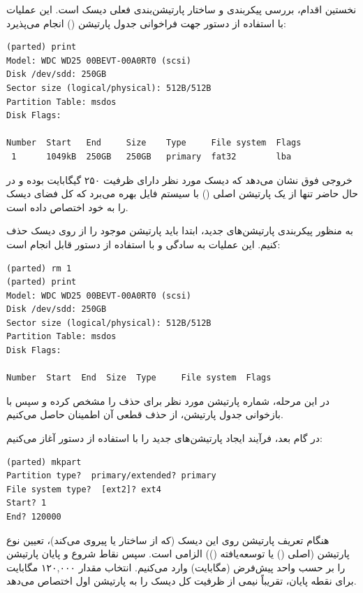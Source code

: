 نخستین اقدام، بررسی پیکربندی و ساختار پارتیشن‌بندی فعلی دیسک است. این عملیات با استفاده از دستور  جهت فراخوانی جدول پارتیشن () انجام می‌پذیرد:

\begin{latin}
\begin{lstlisting}
(parted) print
Model: WDC WD25 00BEVT-00A0RT0 (scsi)
Disk /dev/sdd: 250GB
Sector size (logical/physical): 512B/512B
Partition Table: msdos
Disk Flags:

Number  Start   End     Size    Type     File system  Flags
 1      1049kB  250GB   250GB   primary  fat32        lba
\end{lstlisting}
\end{latin}

خروجی فوق نشان می‌دهد که دیسک مورد نظر دارای ظرفیت ۲۵۰ گیگابایت بوده و در حال حاضر تنها از یک پارتیشن اصلی () با سیستم فایل  بهره می‌برد که کل فضای دیسک را به خود اختصاص داده است.

به منظور پیکربندی پارتیشن‌های جدید، ابتدا باید پارتیشن موجود را از روی دیسک حذف کنیم. این عملیات به سادگی و با استفاده از دستور  قابل انجام است:

\begin{latin}
\begin{lstlisting}
(parted) rm 1
(parted) print
Model: WDC WD25 00BEVT-00A0RT0 (scsi)
Disk /dev/sdd: 250GB
Sector size (logical/physical): 512B/512B
Partition Table: msdos
Disk Flags:

Number  Start  End  Size  Type     File system  Flags
\end{lstlisting}
\end{latin}

در این مرحله، شماره پارتیشن مورد نظر برای حذف را مشخص کرده و سپس با بازخوانی جدول پارتیشن، از حذف قطعی آن اطمینان حاصل می‌کنیم.

در گام بعد، فرآیند ایجاد پارتیشن‌های جدید را با استفاده از دستور  آغاز می‌کنیم:

\begin{latin}
\begin{lstlisting}
(parted) mkpart
Partition type?  primary/extended? primary
File system type?  [ext2]? ext4
Start? 1
End? 120000
\end{lstlisting}
\end{latin}

هنگام تعریف پارتیشن روی این دیسک (که از ساختار  یا  پیروی می‌کند)، تعیین نوع پارتیشن (اصلی () یا توسعه‌یافته ()) الزامی است. سپس نقاط شروع و پایان پارتیشن را بر حسب واحد پیش‌فرض (مگابایت) وارد می‌کنیم. انتخاب مقدار ۱۲۰,۰۰۰ مگابایت برای نقطه پایان، تقریباً نیمی از ظرفیت کل دیسک را به پارتیشن اول اختصاص می‌دهد.

